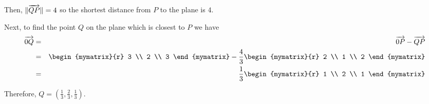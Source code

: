 \begin{solution}
Then, $\|\overrightarrow{QP}\| = 4$ so the shortest distance from $P$ to the plane is $4$. 

Next, to find the point $Q$ on the plane which is closest to $P$ we have
\begin{eqnarray*}
\longvect{0Q} &=& \longvect{0P} - \longvect{QP} \\
&=& \begin{mymatrix}{r}
3 \\
2 \\
3
\end{mymatrix} 
-
\frac{4}{3} \begin{mymatrix}{r}
2 \\
1 \\
2
\end{mymatrix} \\
&=& 
\frac{1}{3}
\begin{mymatrix}{r}
1 \\
2 \\
1
\end{mymatrix}
\end{eqnarray*}

Therefore, $Q = (\frac{1}{3}, \frac{2}{3}, \frac{1}{3} )$.  
\end{solution}
